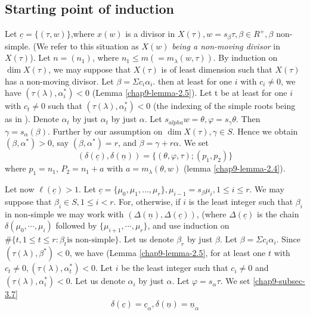 \subsection*{Starting point of induction}
Let $\underline{c}=\{(\tau, w)\}$,where $x(w)$ is a divisor in $X(\tau),w = s_{\beta}\tau, \beta \in R^{+}, \beta$ non-simple. (We refer to this situation as $X(w)$ \textit{being a non-moving divisor} in $X(\tau)$). Let $n=(n_{1})$, where $n_{1} \leq m(=m_{\lambda}(w,\tau))$. By induction on $\dim X(\tau)$, we may suppose that $X(\tau)$ is of least dimension such that $X(\tau)$ has a non-moving divisor. Let $\beta =\Sigma c_{i}\alpha_{i}$. then at least for one $i$ with $c_{i}\neq 0$, we have $(\tau(\lambda), \alpha_{i}^{*}) < 0$ (Lemma \ref{chap9-lemma-2.5}). Let t be at least for one $i$  with $c_{t}\neq 0$ such that $(\tau(\lambda), \alpha_{t}^{*})< 0$ (the indexing of the simple roots being as
in \cite{chap9-keyB}). Denote $\alpha_{t}$ by just $\alpha_{t}$ by just $\alpha$. Let $s_{alpha}w = \theta, \varphi =s_{\gamma}\theta$. Then $\gamma = s_{\alpha}(\beta)$. Further by our assumption on $\dim X(\tau), \gamma \in S$. Hence we obtain $(\beta, \alpha^{*}) > 0$, say $(\beta, \alpha^{*})=r$, and $\beta = \gamma + r \alpha$. We set
$$
(\delta(\underline{c}), \delta(\underline{n}))=\{(\theta, \varphi, \tau); (p_{1},p_{2})\}
$$
where $p_{1}=n_{1}$, $P_{2}=n_{1}+a$ with $a=m_{\lambda}(\theta, w)$ (lemma \ref{chap9-lemma-2.4}).

Let now $\ell(\underline{c}) > 1$. Let $\underline{c}= \{\mu_{0}, \mu_{1}, \ldots, \mu_{r}\}, \mu_{i-1} = s_{\beta}\mu_{i}, 1\leq i \leq r$. We may suppose that $\beta_{i} \in S, 1 \leq i < r$. For, otherwise, if $i$ is the least integer such that $\beta_{i}$ in non-simple we may work with $(\Delta(\underline{n}), \Delta(\underline{c}))$, (where   $\Delta(\underline{c})$ is the chain $\delta(\mu_{0},\cdots,\mu_{i})$ followed by $\{ \mu_{i+1}, \cdots, \mu_{r}\}$, and use induction on $\#\{t, 1\leq t \leq r : \beta_{t} \text{is non-simple}\}$. Let us denote $\beta_{r}$ by just $\beta$. Let $\beta =\Sigma c_{i}\alpha_{i}$. Since $(\tau(\lambda), \beta^{*}) < 0$, we have
(Lemma \ref{chap9-lemma-2.5}, for at least one $t$ with $c_{t}\neq 0, (\tau(\lambda), \alpha_{t}^{*})< 0$. Let $i$ be the least integer such that $c_{i}\neq 0$ and $(\tau(\lambda), \alpha_{i}^{*}) < 0$. Let us denote $\alpha_{i}$ by just $\alpha$. Let  $\varphi= s_{\alpha}\tau$. We set \eqref{chap9-subsec-3.7}
$$
\delta(\underline{c})= \underline{c}_{\alpha}, \delta(\underline{n}) = \underline{n}_{\alpha}
$$

